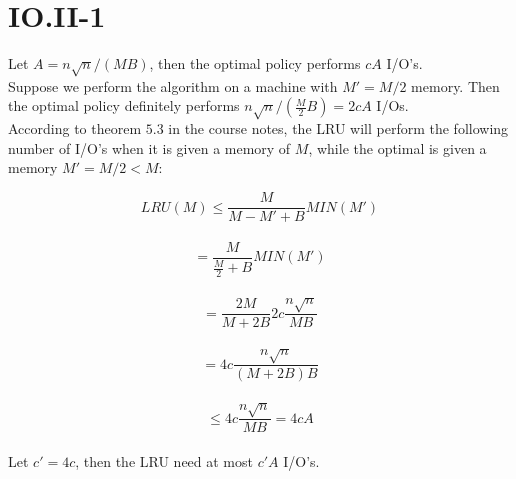 \section*{IO.II-1}
Let $A = n\sqrt{n} / (M B)$, then the optimal policy performs $cA$ I/O's.\\

Suppose we perform the algorithm on a machine with $M' = M / 2$ memory. Then the optimal policy definitely performs $n\sqrt{n} / (\frac{M}{2} B) = 2cA$ I/Os. \\

According to theorem $5.3$ in the course notes, the LRU will perform the following number of I/O's when it is given a memory of $M$, while the optimal is given a memory $M' = M / 2 < M$:

$$LRU(M) \leq \frac{M}{M - M' + B} MIN(M')$$ \\
$$= \frac{M}{\frac{M}{2} + B} MIN(M')$$ \\ 
$$= \frac{2M}{M + 2B}2c\frac{n\sqrt{n}}{MB}$$ \\
$$= 4c\frac{n\sqrt{n}}{(M + 2B)B}$$ \\
$$\leq 4c\frac{n\sqrt{n}}{MB} = 4cA$$ \\ 

Let $c' = 4c$, then the LRU need at most $c'A$ I/O's.

